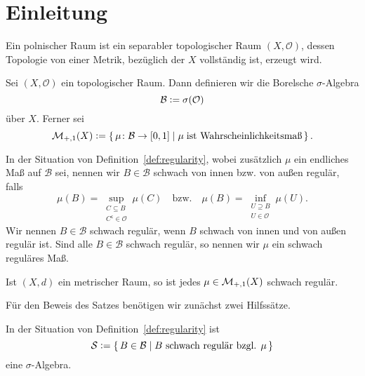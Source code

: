 \documentclass[../main/main.tex]{subfiles}
\begin{document}
	
	\section{Einleitung}
	
	
	\begin{Definition}
		Ein polnischer Raum ist ein separabler topologischer Raum $(X, \mathcal{O})$, 
		dessen Topologie von einer Metrik, bezüglich der $X$ vollständig ist, erzeugt wird.
	\end{Definition}

	\begin{Definition}
		\label{def:borel}
		Sei $(X, \mathcal{O})$ ein topologischer Raum. Dann definieren wir die Borelsche $\sigma$-Algebra
		$$\mathcal{B} \vcentcolon = \sigma(\mathcal{O})$$
		über $X$. Ferner sei
		$$\mathcal{M}_{+,1}(X) \vcentcolon = \left\{\, \mu \colon \mathcal{B} \to [0,1] \; | \; \mu \; \text{ist Wahrscheinlichkeitsmaß} \,\right\}\text{.}$$
	\end{Definition}

	\begin{Definition}
		\label{def:regularity}
		In der Situation von Definition~\ref{def:regularity}, wobei zusätzlich $\mu$ ein 
		endliches Maß auf $\mathcal{B}$ sei, nennen wir $B \in \mathcal{B}$ schwach von 
		innen bzw. von außen regulär, falls
		$$\mu(B) = \sup_{\substack{C \subseteq B \\ C^\mathsf{c} \in \mathcal{O}}} \mu(C) \quad \text{bzw.} \quad \mu(B) = \inf_{\substack{U \supseteq B \\ U \in \mathcal{O}}} \mu(U)\text{.}$$
		Wir nennen $B \in \mathcal{B}$ schwach regulär, wenn $B$ schwach von innen und 
		von außen regulär ist. Sind alle $B \in \mathcal{B}$ schwach regulär, 
		so nennen wir $\mu$ ein schwach reguläres Maß.
	\end{Definition}

	\begin{Satz}
		\label{thm:weakregularity}
		Ist $(X, d)$ ein metrischer Raum, so ist jedes $\mu \in \mathcal{M}_{+,1}(X)$ 
		schwach regulär.
	\end{Satz}

	Für den Beweis des Satzes benötigen wir zunächst zwei Hilfssätze.
	
	\begin{Hilfssatz}
		\label{lem:sigmaalg}
		In der Situation von Definition~\ref{def:regularity} ist
		$$\mathcal{S} \vcentcolon = \left\{\, B \in \mathcal{B} \; | \; B \text{ schwach regulär bzgl. } \mu \,\right\}$$
		eine $\sigma$-Algebra.
	\end{Hilfssatz}
	
\end{document}
